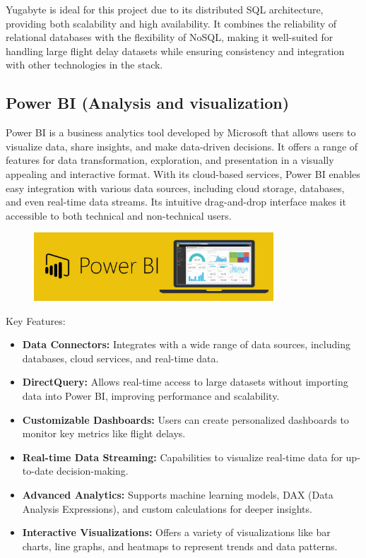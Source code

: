 \documentclass[12pt,a4paper]{article}
\begin{document}
Yugabyte is ideal for this project due to its distributed SQL architecture,
providing both scalability and high availability. It combines the reliability of
relational databases with the flexibility of NoSQL, making it well-suited for
handling large flight delay datasets while ensuring consistency and integration
with other technologies in the stack.

\subsection{Power BI (Analysis and visualization)}
Power BI is a business analytics tool developed by Microsoft that allows users
to visualize data, share insights, and make data-driven decisions. It offers a
range of features for data transformation, exploration, and presentation in a
visually appealing and interactive format. With its cloud-based services, Power
BI enables easy integration with various data sources, including cloud storage,
databases, and even real-time data streams. Its intuitive drag-and-drop
interface makes it accessible to both technical and non-technical users.
\begin{figure}[H]
    \begin{center}
        \includegraphics[width=0.8\textwidth]{Images/powerBI.png}
    \end{center}
\end{figure}

Key Features:
\begin{itemize}
    \item \textbf{Data Connectors:} Integrates with a wide range of data
    sources, including databases, cloud services, and real-time data.
    \item \textbf{DirectQuery:} Allows real-time access to large datasets
    without importing data into Power BI, improving performance and scalability.
    \item \textbf{Customizable Dashboards:} Users can create personalized
    dashboards to monitor key metrics like flight delays.
    \item \textbf{Real-time Data Streaming:} Capabilities to visualize real-time
    data for up-to-date decision-making.
    \item \textbf{Advanced Analytics:} Supports machine learning models, DAX
    (Data Analysis Expressions), and custom calculations for deeper insights.
    \item \textbf{Interactive Visualizations:} Offers a variety of
    visualizations like bar charts, line graphs, and heatmaps to represent
    trends and data patterns.
\end{itemize}
\end{document}
